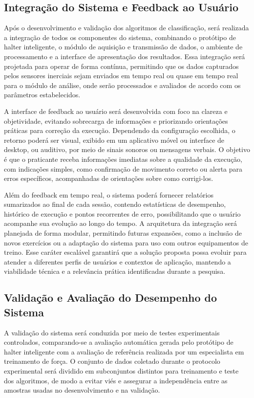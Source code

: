 \subsection{Integração do Sistema e Feedback ao Usuário}

Após o desenvolvimento e validação dos algoritmos de classificação, será realizada a integração de todos os componentes do sistema, combinando o protótipo de halter inteligente, o módulo de aquisição e transmissão de dados, o ambiente de processamento e a interface de apresentação dos resultados. Essa integração será projetada para operar de forma contínua, permitindo que os dados capturados pelos sensores inerciais sejam enviados em tempo real ou quase em tempo real para o módulo de análise, onde serão processados e avaliados de acordo com os parâmetros estabelecidos.

A interface de feedback ao usuário será desenvolvida com foco na clareza e objetividade, evitando sobrecarga de informações e priorizando orientações práticas para correção da execução. Dependendo da configuração escolhida, o retorno poderá ser visual, exibido em um aplicativo móvel ou interface de desktop, ou auditivo, por meio de sinais sonoros ou mensagens verbais. O objetivo é que o praticante receba informações imediatas sobre a qualidade da execução, com indicações simples, como confirmação de movimento correto ou alerta para erros específicos, acompanhadas de orientações sobre como corrigi-los.

Além do feedback em tempo real, o sistema poderá fornecer relatórios sumarizados ao final de cada sessão, contendo estatísticas de desempenho, histórico de execução e pontos recorrentes de erro, possibilitando que o usuário acompanhe sua evolução ao longo do tempo. A arquitetura da integração será planejada de forma modular, permitindo futuras expansões, como a inclusão de novos exercícios ou a adaptação do sistema para uso com outros equipamentos de treino. Esse caráter escalável garantirá que a solução proposta possa evoluir para atender a diferentes perfis de usuários e contextos de aplicação, mantendo a viabilidade técnica e a relevância prática identificadas durante a pesquisa.

\subsection{ Validação e Avaliação do Desempenho do Sistema}

A validação do sistema será conduzida por meio de testes experimentais controlados, comparando-se a avaliação automática gerada pelo protótipo de halter inteligente com a avaliação de referência realizada por um especialista em treinamento de força. O conjunto de dados coletado durante o protocolo experimental será dividido em subconjuntos distintos para treinamento e teste dos algoritmos, de modo a evitar viés e assegurar a independência entre as amostras usadas no desenvolvimento e na validação.

